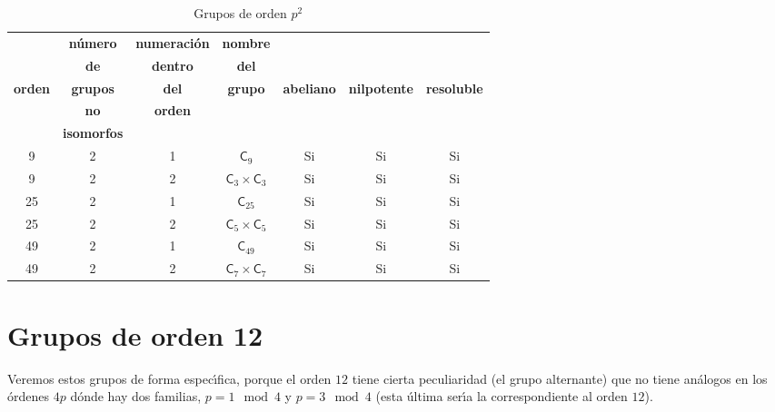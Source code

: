 \documentclass[final,12pt,a4paper,twoside,fleqn]{extbook}
\theoremstyle{definition}
\theoremstyle{remark}
\begin{document}
\begin{table}[h!]
    \begin{center}
        \caption{Grupos de orden $p^2$}
        \label{tab:GruposDeOrden$p^2$}
        \begin{tabular}{c|c|c|c|c|c|c} %
            \textbf{} & \tiny\textbf{n\'umero} &\tiny\textbf{numeraci\'on} & \tiny\textbf{nombre} & \textbf{} & {} & {} \\
            \textbf{} & \tiny\textbf{de} &\tiny\textbf{dentro} & \tiny\textbf{del} & \tiny\textbf{} & {} & {} \\
            \tiny\textbf{orden} & \tiny\textbf{grupos} & \tiny\textbf{del} & \tiny\textbf{grupo} & \tiny\textbf{abeliano}  & \tiny\textbf{nilpotente} & \tiny\textbf{resoluble} \\
            \textbf{} & \tiny\textbf{no} & \tiny\textbf{orden} & \textbf{} & \textbf{} & {} & {} \\
            \textbf{} & \tiny\textbf{isomorfos} &\textbf{} & \textbf{} & \textbf{} & {} & {} \\
            \hline
            9 & 2 & 1 & ${\textsf{C}}_{9}$ & Si & Si & Si \\
            \hline
            9 & 2 & 2  & ${{\textsf{C}}_{3}}                  \times                  {{\textsf{C}}_{3}}$ & Si & Si & Si \\
            \hline
            25 & 2 & 1 & ${{\textsf{C}}_{25}}$ & Si & Si & Si \\
            \hline
            25 & 2 & 2 & ${{\textsf{C}}_{5}}                  \times                  {{\textsf{C}}_{5}}$ & Si & Si & Si \\
            \hline
            49 & 2 & 1 & ${{\textsf{C}}_{49}}$ & Si & Si & Si \\
            \hline
            49 & 2 & 2 & ${{\textsf{C}}_{7}}                  \times                  {{\textsf{C}}_{7}}$ & Si & Si & Si \\
            \hline
        \end{tabular}
    \end{center}
\end{table}


\chapter{Grupos de orden 12}

Veremos estos grupos de forma espec{\'{\i}}fica, porque el orden $12$ tiene cierta peculiaridad (el grupo alternante) que no tiene an\'alogos en los \'ordenes $4p$ d\'onde hay dos familias, $p=1 \mod 4$ y $p=3\mod 4$ (esta \'ultima ser{\'{\i}}a la correspondiente al orden $12$).
\end{document}

